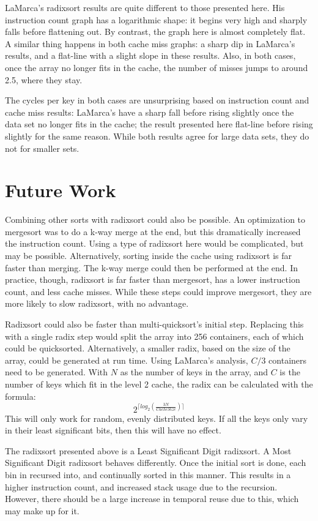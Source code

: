 LaMarca's radixsort results are quite different to those presented here. His
instruction count graph has a logarithmic shape: it begins very high and sharply
falls before flattening out. By contrast, the graph here is almost completely
flat. A similar thing happens in both cache miss graphs: a sharp dip in
LaMarca's results, and a flat-line with a slight slope in these results. Also,
in both cases, once the array no longer fits in the cache, the number of misses
jumps to around 2.5, where they stay. 

The cycles per key in both cases are unsurprising based on instruction count and
cache miss results: LaMarca's have a sharp fall before rising slightly once the
data set no longer fits in the cache; the result presented here flat-line before rising
slightly for the same reason. While both results agree for large data sets, they do not
for smaller sets.

\section{Future Work}
\label{radix future work}
Combining other sorts with radixsort could also be possible. An optimization to
mergesort was to do a k-way merge at the end, but this dramatically increased
the instruction count. Using a type of radixsort here would be complicated, but
may be possible. Alternatively, sorting inside the cache using radixsort is far
faster than merging. The k-way merge could then be performed at the end. In
practice, though, radixsort is far faster than mergesort, has a lower
instruction count, and less cache misses. While these steps could improve
mergesort, they are more likely to slow radixsort, with no advantage.

Radixsort could also be faster than multi-quicksort's initial step. Replacing
this with a single radix step would split the array into 256 containers, each of
which could be quicksorted. Alternatively, a smaller radix, based on the size of
the array, could be generated at run time. Using LaMarca's analysis,
$C/3$ containers need to be generated. With $N$ as the number of keys in the
array, and $C$ is the number of keys which fit in the level 2 cache, the radix
can be calculated with the formula:
$$2^{\lceil{}log_2(\frac{3N}{CacheSize})\rceil{}}$$
This will only work for random, evenly distributed keys. If all the keys only
vary in their least significant bits, then this will have no effect.

The radixsort presented above is a Least Significant Digit radixsort. A Most
Significant Digit radixsort behaves differently. Once the initial sort is done, each
bin in recursed into, and continually sorted in this manner. This results in a
higher instruction count, and increased stack usage due to the recursion.
However, there should be a large increase in temporal reuse due to this, which
may make up for it.

